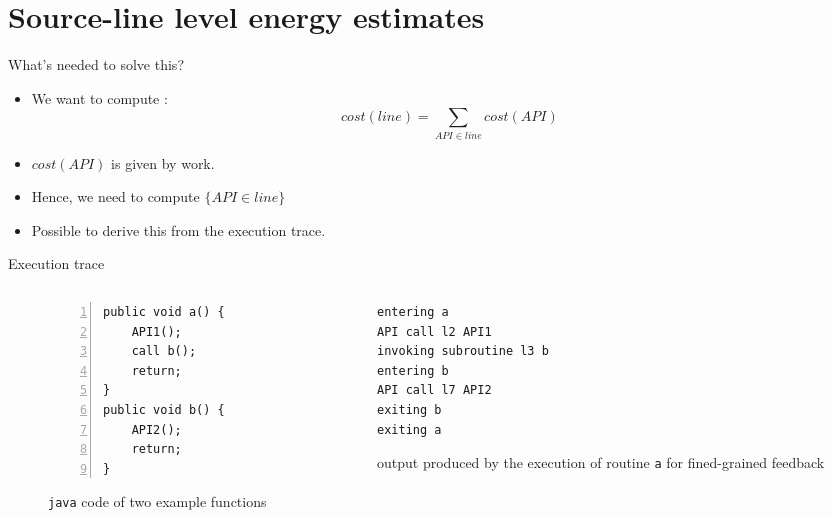 \section{Source-line level energy estimates}
%
%
\begin{frame}{What's needed to solve this?}
\begin{itemize}
\item We want to compute :
$$cost(line) = \sum_{API \in line} cost(API)$$
\item $cost(API)$ is given by \lv{} work.
\item Hence, we need to compute $\{API \in line\}$
\item Possible to derive this from the execution trace.
\end{itemize}
\end{frame}  
%
%
\begin{frame}[fragile]{Execution trace}
\begin{columns}
\begin{column}{0.5\textwidth}
\begin{figure}%
\centering
\begin{lstlisting}[numbers=left]
public void a() {
	API1();
	call b();
	return;
}
public void b() {
	API2();
	return;
}
\end{lstlisting}
\caption{\texttt{java} code of two example functions}
\label{fig:exfunctions}
\end{figure}
\end{column}
%
\begin{column}{0.5\textwidth}
\begin{figure}
\centering
\begin{lstlisting}
entering a
API call l2 API1
invoking subroutine l3 b
entering b
API call l7 API2
exiting b
exiting a
\end{lstlisting}
\caption{\logcat{} output produced by the execution of routine \texttt{a} for fined-grained feedback}
\label{fig:exlogcat3}
\end{figure}
\end{column}
\end{columns}
\end{frame}  
%
%
